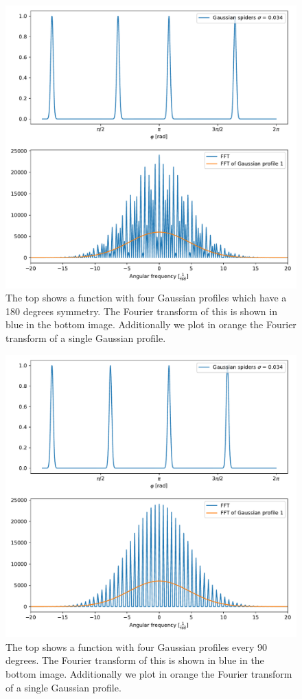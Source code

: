 \begin{figure}[H]
	\centering
		\includegraphics[width=1.0\textwidth]{pics/Gaussian_fourspyders.pdf}
		\caption{The top shows a function with four Gaussian profiles which have a 180 degrees symmetry. The Fourier transform of this is shown in blue in the bottom image. Additionally we plot in orange the Fourier transform of a single Gaussian profile.}
		\label{fig:Gauss_fourspyders}
\end{figure} 
\begin{figure}[H]
	\centering
		\includegraphics[width=1.0\textwidth]{pics/Gaussian_fourspyders90.pdf}
		\caption{The top shows a function with four Gaussian profiles every 90 degrees. The Fourier transform of this is shown in blue in the bottom image. Additionally we plot in orange the Fourier transform of a single Gaussian profile.}
		\label{fig:Gauss_fourspyders90}
\end{figure} 
